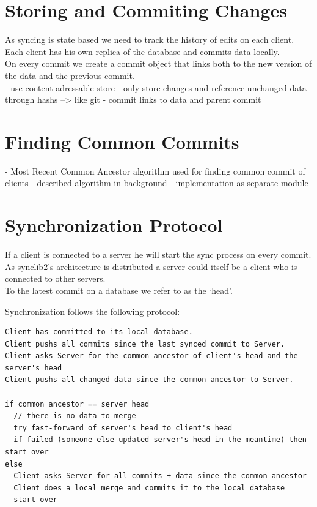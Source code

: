 \section{Storing and Commiting Changes}
As syncing is state based we need to track the history of edits on each client.\\Each client has his own replica of the database and commits
data locally.\\On every commit we create a commit object that links both
to the new version of the data and the previous commit.\\

- use content-adressable store
- only store changes and reference unchanged data through hashs --> like git
- commit links to data and parent commit

\section{Finding Common Commits}
- Most Recent Common Ancestor algorithm used for finding common commit of clients
- described algorithm in background
- implementation as separate module

\section{Synchronization Protocol}
If a client is connected to a server he will start the sync process on every commit. As
synclib2's architecture is distributed a server could itself be a client
who is connected to other servers.\\To the latest commit on a database
we refer to as the `head'.

Synchronization follows the following protocol:

\begin{verbatim}
Client has committed to its local database.
Client pushs all commits since the last synced commit to Server.
Client asks Server for the common ancestor of client's head and the server's head
Client pushs all changed data since the common ancestor to Server.

if common ancestor == server head
  // there is no data to merge
  try fast-forward of server's head to client's head
  if failed (someone else updated server's head in the meantime) then start over
else
  Client asks Server for all commits + data since the common ancestor
  Client does a local merge and commits it to the local database
  start over
\end{verbatim}

